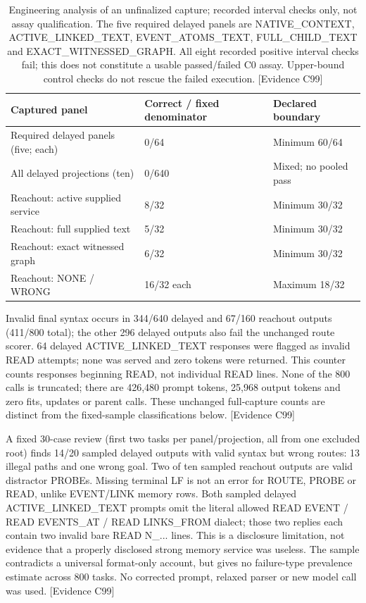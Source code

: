 \documentclass[11pt]{article}
\newcommand{\ev}[1]{\textsf{[Evidence #1]}}
\begin{document}
\begin{table}[ht]
\centering\small
\begin{tabular}{lll}
\toprule
Captured panel & Correct / fixed denominator & Declared boundary \\
\midrule
Required delayed panels (five; each) & 0/64 & Minimum 60/64 \\
All delayed projections (ten) & 0/640 & Mixed; no pooled pass \\
Reachout: active supplied service & 8/32 & Minimum 30/32 \\
Reachout: full supplied text & 5/32 & Minimum 30/32 \\
Reachout: exact witnessed graph & 6/32 & Minimum 30/32 \\
Reachout: NONE / WRONG & 16/32 each & Maximum 18/32 \\
\bottomrule
\end{tabular}
\caption{Engineering analysis of an unfinalized capture; recorded interval
checks only, not assay qualification. The five required delayed
panels are NATIVE\_CONTEXT, ACTIVE\_LINKED\_TEXT, EVENT\_ATOMS\_TEXT,
FULL\_CHILD\_TEXT and EXACT\_WITNESSED\_GRAPH. All eight recorded positive
interval checks fail; this does not constitute a usable passed/failed C0
assay. Upper-bound control checks do not rescue the failed execution. \ev{C99}}
\end{table}

Invalid final syntax occurs in 344/640 delayed and 67/160 reachout outputs
(411/800 total); the other 296 delayed outputs also fail the unchanged route
scorer. 64 delayed ACTIVE\_LINKED\_TEXT responses were flagged as invalid READ
attempts; none was served and zero tokens were returned. This counter counts
responses beginning READ, not individual READ lines. None of the 800 calls is truncated;
there are 426,480 prompt tokens, 25,968 output tokens and zero fits, updates or
parent calls. These unchanged full-capture counts are distinct from the
fixed-sample classifications below. \ev{C99}

A fixed 30-case review (first two tasks per panel/projection, all from one
excluded root) finds 14/20 sampled delayed outputs with valid syntax but wrong
routes: 13 illegal paths and one wrong goal. Two of ten sampled reachout outputs
are valid distractor PROBEs. Missing terminal LF is not an error for ROUTE,
PROBE or READ, unlike EVENT/LINK memory rows. Both sampled delayed ACTIVE\_LINKED\_TEXT
prompts omit the literal allowed READ EVENT / READ EVENTS\_AT / READ LINKS\_FROM
dialect; those two replies each contain two invalid bare READ N\_... lines. This is a
disclosure limitation, not evidence that a properly disclosed strong memory
service was useless. The sample contradicts a universal format-only account,
but gives no failure-type prevalence estimate across 800 tasks. No corrected
prompt, relaxed parser or new model call was used. \ev{C99}
\end{document}
